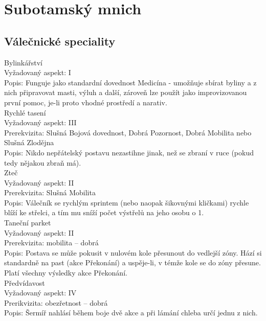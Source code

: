 \documentclass[../main.tex]{subfiles}
\begin{document}
\section{Subotamský mnich}
\label{sec:subatom}

\subsection{Válečnické speciality}
\label{sec:val-spec-sub}

Bylinkářství \\
Vyžadovaný aspekt: I\\
Popis: Funguje jako standardní dovednost Medicína - umožňuje sbírat byliny a z nich připravovat masti, výluh a další, zároveň lze použít jako improvizovanou první pomoc, je-li proto vhodné prostředí a narativ.\\


Rychlé tasení\\
Vyžadovaný aspekt: III\\
Prerekvizita: Slušná Bojová dovednost, Dobrá Pozornost, Dobrá Mobilita nebo Slušná Zlodějna \\
Popis: Nikdo nepřátelský postavu nezastihne jinak, než se zbraní v ruce (pokud tedy nějakou zbraň má).\\


Zteč \\
Vyžadovaný aspekt: II\\
Prerekvizita: Slušná Mobilita\\
Popis: Válečník se rychlým sprintem (nebo naopak šikovnými kličkami) rychle blíží ke střelci, a tím mu sníží počet výstřelů na jeho osobu o 1.\\


Taneční parket \\
Vyžadovaný aspekt: II\\
Prerekvizita: mobilita – dobrá\\
Popis: Postava se může pokusit v nulovém kole přesunout do vedlejší zóny. Hází si standardně na past (akce Překonání) a uspěje-li, v témže kole se do zóny přesune. Platí všechny výsledky akce Překonání.\\


Předvídavost \\
Vyžadovaný aspekt: IV\\
Prerikvizita: obezřetnost – dobrá\\
Popis: Šermíř nahlásí během boje dvě akce a při lámání chleba určí jednu z nich. \\
\end{document}
